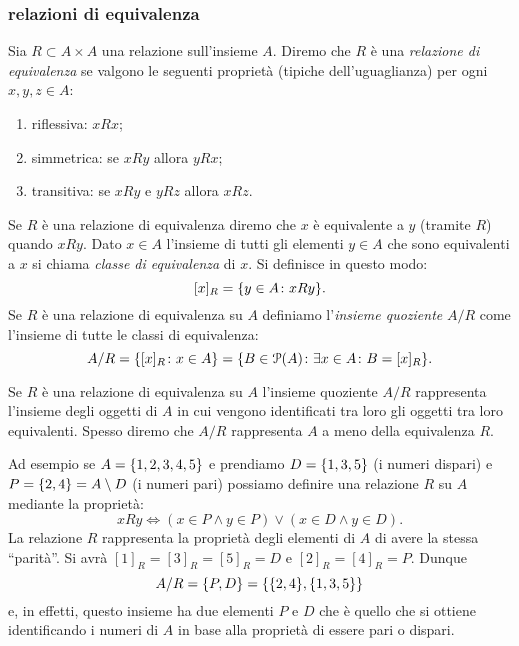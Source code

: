 \subsubsection{relazioni di equivalenza}

\begin{definition}
\label{def:equivalenza}%
\label{def:insieme_quoziente}%
Sia $R\subset A\times A$ una relazione sull'insieme $A$. Diremo che 
$R$ è una \emph{relazione di equivalenza}%
%
 se valgono le seguenti proprietà
(tipiche dell'uguaglianza)
per ogni $x,y,z\in A$:
\begin{enumerate}
  \item riflessiva: $x R x$;
  \item simmetrica: se $x R y$ allora $y R x$;
  \item transitiva: se $x R y$ e $yRz$ allora $x R z$.
\end{enumerate}
Se $R$ è una relazione di equivalenza diremo che $x$ è equivalente a $y$ 
(tramite $R$) quando $xRy$.
Dato $x \in A$ l'insieme di tutti gli elementi $y\in A$ che sono equivalenti 
a $x$ si chiama \emph{classe di equivalenza}%
%
 di $x$. 
Si definisce in questo modo:
\[
  [x]_R = {\left\{ y\in A \colon xRy \right\}}.  
\]
Se $R$ è una relazione di equivalenza su $A$ definiamo 
l'\emph{insieme quoziente}
%
%
$A/R$
come l'insieme di tutte le classi di equivalenza:
\[
 A/R 
 = {\left\{ [x]_R\colon x\in A \right\}} 
 = {\left\{ B\in \mathcal P(A)\colon \exists x\in A\colon B=[x]_R \right\}}.  
\]
\end{definition}

Se $R$ è una relazione di equivalenza su $A$ 
l'insieme quoziente $A/R$ rappresenta l'insieme 
degli oggetti di $A$ in cui vengono identificati tra loro gli oggetti tra loro 
equivalenti.
Spesso diremo che $A/R$ rappresenta $A$ a meno della equivalenza $R$.

Ad esempio se $A={\left\{ 1,2,3,4,5 \right\}}$ e prendiamo $D={\left\{ 1,3,5 \right\}}$ (i numeri dispari)
e $P={\left\{ 2,4 \right\}}=A\setminus D$ 
(i numeri pari) possiamo definire una relazione $R$ su $A$ mediante la proprietà:
\[
 x R  y \iff (x\in P \land y\in P) \lor (x\in D \land y\in D).
\]
La relazione $R$ rappresenta la proprietà degli elementi di $A$ 
di avere la stessa ``parità''. 
Si avrà $[1]_R = [3]_R=[5]_R= D$ e $[2]_R=[4]_R=P$.
Dunque 
\[
   A/R = {\left\{ P,D \right\}} = {\left\{ {\left\{ 2,4 \right\}},{\left\{ 1,3,5 \right\}} \right\}}
\]
e, in effetti, questo insieme ha due elementi $P$ e $D$ che è quello 
che si ottiene identificando i numeri di $A$ in base alla proprietà 
di essere pari o dispari. 

